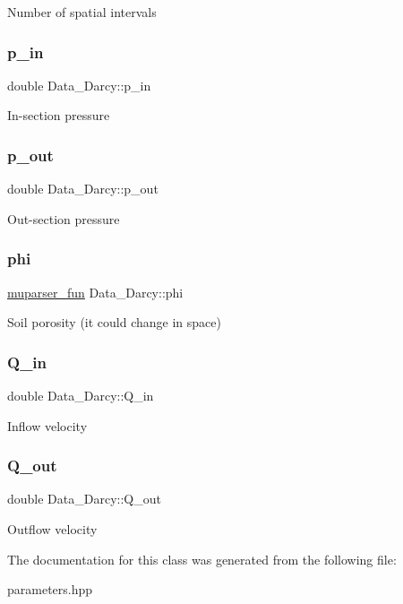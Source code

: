 Number of spatial intervals \mbox{\label{classData__Darcy_a4c9aef907e96d72e9d75e4d9a69bd8c0}} 
\subsubsection{\texorpdfstring{p\+\_\+in}{p\_in}}
{\footnotesize\ttfamily double Data\+\_\+\+Darcy\+::p\+\_\+in}

In-\/section pressure \mbox{\label{classData__Darcy_a0c67d809cec0e3a70fa8103e1727b3d5}} 
\subsubsection{\texorpdfstring{p\+\_\+out}{p\_out}}
{\footnotesize\ttfamily double Data\+\_\+\+Darcy\+::p\+\_\+out}

Out-\/section pressure \mbox{\label{classData__Darcy_a2838fcf94c2a9e3ae7fa234964d63b47}} 
\subsubsection{\texorpdfstring{phi}{phi}}
{\footnotesize\ttfamily \hyperlink{classmuparser__fun}{muparser\+\_\+fun} Data\+\_\+\+Darcy\+::phi}

Soil porosity (it could change in space) \mbox{\label{classData__Darcy_a0b571112f2b3767a50d6c9ee5d9b64f2}} 
\subsubsection{\texorpdfstring{Q\+\_\+in}{Q\_in}}
{\footnotesize\ttfamily double Data\+\_\+\+Darcy\+::\+Q\+\_\+in}

Inflow velocity \mbox{\label{classData__Darcy_a904d9b426d753e4a8b61599c2aac0afd}} 
\subsubsection{\texorpdfstring{Q\+\_\+out}{Q\_out}}
{\footnotesize\ttfamily double Data\+\_\+\+Darcy\+::\+Q\+\_\+out}

Outflow velocity 

The documentation for this class was generated from the following file\+:\begin{DoxyCompactItemize}
\item 
parameters.\+hpp\end{DoxyCompactItemize}
